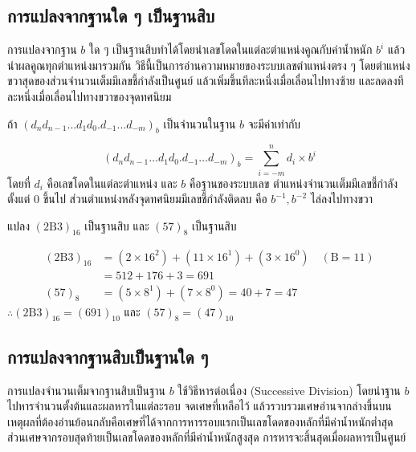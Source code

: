 \subsection{การแปลงจากฐานใด ๆ เป็นฐานสิบ}
\label{ssec:any-base-to-decimal}
การแปลงจากฐาน $b$ ใด ๆ เป็นฐานสิบทำได้โดยนำเลขโดดในแต่ละตำแหน่งคูณกับค่าน้ำหนัก $b^i$ แล้วนำผลคูณทุกตำแหน่งมารวมกัน วิธีนี้เป็นการอ่านความหมายของระบบเลขตำแหน่งตรง ๆ โดยตำแหน่งขวาสุดของส่วนจำนวนเต็มมีเลขชี้กำลังเป็นศูนย์ แล้วเพิ่มขึ้นทีละหนึ่งเมื่อเลื่อนไปทางซ้าย และลดลงทีละหนึ่งเมื่อเลื่อนไปทางขวาของจุดทศนิยม~\parencite{mano2018digital}

\begin{principle}
\label{principle:general-base-expansion}
ถ้า $(d_n d_{n-1} \ldots d_1 d_0 . d_{-1} \ldots d_{-m})_b$ เป็นจำนวนในฐาน $b$ จะมีค่าเท่ากับ

$$(d_n d_{n-1} \ldots d_1 d_0 . d_{-1} \ldots d_{-m})_b = \sum_{i=-m}^{n} d_i \times b^i$$
โดยที่ $d_i$ คือเลขโดดในแต่ละตำแหน่ง และ $b$ คือฐานของระบบเลข ตำแหน่งจำนวนเต็มมีเลขชี้กำลังตั้งแต่ $0$ ขึ้นไป ส่วนตำแหน่งหลังจุดทศนิยมมีเลขชี้กำลังติดลบ คือ $b^{-1}, b^{-2}$ ไล่ลงไปทางขวา
\end{principle}

\begin{ex}
\label{ex:any-base-to-dec}
แปลง $(2\mathrm{B}3)_{16}$ เป็นฐานสิบ และ $(57)_8$ เป็นฐานสิบ
\end{ex}
\begin{solution}
\begin{align*}
(2\mathrm{B}3)_{16} &= (2\times16^2)+(11\times16^1)+(3\times16^0) \quad (\mathrm{B}=11)\\
&= 512 + 176 + 3 = 691\\
(57)_8 &= (5\times8^1)+(7\times8^0) = 40 + 7 = 47
\end{align*}
$\therefore (2\mathrm{B}3)_{16} = (691)_{10}$ และ $(57)_8 = (47)_{10}$ \solhere
\end{solution}

\subsection{การแปลงจากฐานสิบเป็นฐานใด ๆ}
\label{ssec:decimal-to-any-base}
การแปลงจำนวนเต็มจากฐานสิบเป็นฐาน $b$ ใช้วิธีหารต่อเนื่อง (Successive Division) โดยนำฐาน $b$ ไปหารจำนวนตั้งต้นและผลหารในแต่ละรอบ จดเศษที่เหลือไว้ แล้วรวบรวมเศษอ่านจากล่างขึ้นบน เหตุผลที่ต้องอ่านย้อนกลับคือเศษที่ได้จากการหารรอบแรกเป็นเลขโดดของหลักที่มีค่าน้ำหนักต่ำสุด ส่วนเศษจากรอบสุดท้ายเป็นเลขโดดของหลักที่มีค่าน้ำหนักสูงสุด การหารจะสิ้นสุดเมื่อผลหารเป็นศูนย์~\parencite{patterson2020organization}

